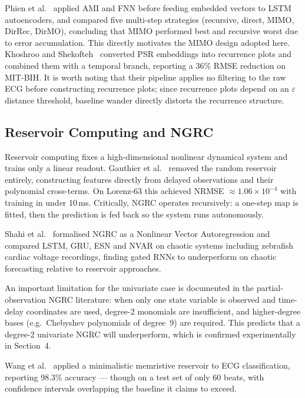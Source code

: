 \documentclass[11pt,a4paper]{article}
\begin{document}
Phien et al.~\cite{phien2023} applied AMI and FNN before feeding embedded vectors to LSTM autoencoders, and compared five multi-step strategies (recursive, direct, MIMO, DirRec, DirMO), concluding that MIMO performed best and recursive worst due to error accumulation.
This directly motivates the MIMO design adopted here.
Khoshroo and Shekofteh~\cite{khoshroo2025} converted PSR embeddings into recurrence plots and combined them with a temporal branch, reporting a 36\% RMSE reduction on MIT-BIH.
It is worth noting that their pipeline applies no filtering to the raw ECG before constructing recurrence plots; since recurrence plots depend on an $\varepsilon$ distance threshold, baseline wander directly distorts the recurrence structure.

\subsection{Reservoir Computing and NGRC}

Reservoir computing fixes a high-dimensional nonlinear dynamical system and trains only a linear readout.
Gauthier et al.~\cite{gauthier2021} removed the random reservoir entirely, constructing features directly from delayed observations and their polynomial cross-terms.
On Lorenz-63 this achieved NRMSE $\approx 1.06 \times 10^{-4}$ with training in under 10\,ms.
Critically, NGRC operates recursively: a one-step map is fitted, then the prediction is fed back so the system runs autonomously.

Shahi et al.~\cite{shahi2022} formalised NGRC as a Nonlinear Vector Autoregression and compared LSTM, GRU, ESN and NVAR on chaotic systems including zebrafish cardiac voltage recordings, finding gated RNNs to underperform on chaotic forecasting relative to reservoir approaches.

An important limitation for the univariate case is documented in the partial-observation NGRC literature: when only one state variable is observed and time-delay coordinates are used, degree-2 monomials are insufficient, and higher-degree bases (e.g.\ Chebyshev polynomials of degree~9) are required.
This predicts that a degree-2 univariate NGRC will underperform, which is confirmed experimentally in Section~4.

Wang et al.~\cite{wang2025} applied a minimalistic memristive reservoir to ECG classification, reporting 98.3\% accuracy --- though on a test set of only 60 beats, with confidence intervals overlapping the baseline it claims to exceed.
\end{document}
